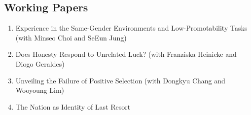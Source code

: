 \documentclass[margin, a4paper]{res}
\begin{document}
\begin{resume}
\section{Working Papers}
\begin{enumerate}[leftmargin=*]
\item Experience in the Same-Gender Environments and Low-Promotability Tasks (with Minseo Choi and SeEun Jung)
\item Does Honesty Respond to Unrelated Luck? (with Franziska Heinicke and Diogo Geraldes)
\item Unveiling the Failure of Positive Selection (with Dongkyu Chang and Wooyoung Lim)
\item The Nation as Identity of Last Resort
\end{enumerate}



\end{resume}
\end{document}
